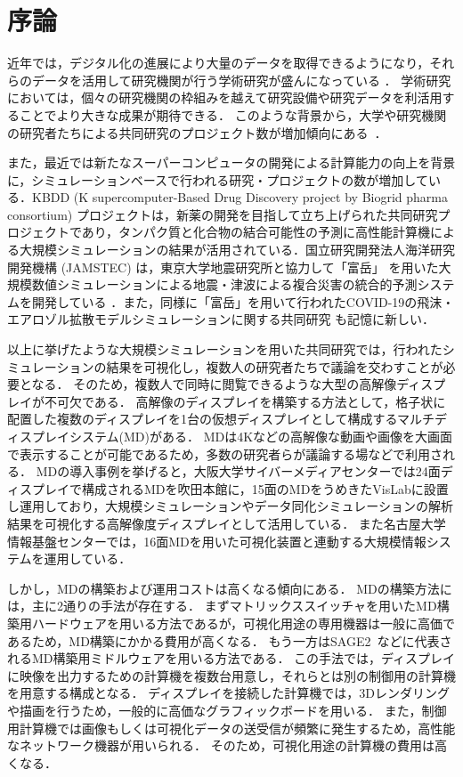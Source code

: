 \chapter{序論}

近年では，デジタル化の進展により大量のデータを取得できるようになり，それらのデータを活用して研究機関が行う学術研究が盛んになっている \cite{guideline}．
学術研究においては，個々の研究機関の枠組みを越えて研究設備や研究データを利活用することでより大きな成果が期待できる．
このような背景から，大学や研究機関の研究者たちによる共同研究のプロジェクト数が増加傾向にある~\cite{nisted,soumusyou}．

また，最近では新たなスーパーコンピュータの開発による計算能力の向上を背景に，シミュレーションベースで行われる研究・プロジェクトの数が増加している．KBDD (K supercomputer-Based Drug Discovery project by Biogrid pharma consortium) プロジェクト\cite{kbdd,kbddproject}は，新薬の開発を目指して立ち上げられた共同研究プロジェクトであり，タンパク質と化合物の結合可能性の予測に高性能計算機による大規模シミュレーションの結果が活用されている．国立研究開発法人海洋研究開発機構 (JAMSTEC) は，東京大学地震研究所と協力して「富岳」 \cite{fugaku}を用いた大規模数値シミュレーションによる地震・津波による複合災害の統合的予測システムを開発している \cite{jishin}．また，同様に「富岳」を用いて行われたCOVID-19の飛沫・エアロゾル拡散モデルシミュレーションに関する共同研究 \cite{covid-19}も記憶に新しい．

以上に挙げたような大規模シミュレーションを用いた共同研究では，行われたシミュレーションの結果を可視化し，複数人の研究者たちで議論を交わすことが必要となる．
そのため，複数人で同時に閲覧できるような大型の高解像ディスプレイが不可欠である．
高解像のディスプレイを構築する方法として，格子状に配置した複数のディスプレイを1台の仮想ディスプレイとして構成するマルチディスプレイシステム(MD)がある．
MDは4Kなどの高解像な動画や画像を大画面で表示することが可能であるため，多数の研究者らが議論する場などで利用される．
MDの導入事例を挙げると，大阪大学サイバーメディアセンターでは24面ディスプレイで構成されるMDを吹田本館に，15面のMDをうめきたVisLabに設置し運用しており，大規模シミュレーションやデータ同化シミュレーションの解析結果を可視化する高解像度ディスプレイとして活用している\cite{ciber_media}．
また名古屋大学情報基盤センターでは，16面MDを用いた可視化装置と連動する大規模情報システムを運用している\cite{nagoya}．

しかし，MDの構築および運用コストは高くなる傾向にある．
MDの構築方法には，主に2通りの手法が存在する．
まずマトリックススイッチャを用いたMD構築用ハードウェアを用いる方法であるが，可視化用途の専用機器は一般に高価であるため，MD構築にかかる費用が高くなる．
もう一方はSAGE2~\cite{sage2}などに代表されるMD構築用ミドルウェアを用いる方法である．
この手法では，ディスプレイに映像を出力するための計算機を複数台用意し，それらとは別の制御用の計算機を用意する構成となる．
ディスプレイを接続した計算機では，3Dレンダリングや描画を行うため，一般的に高価なグラフィックボードを用いる．
また，制御用計算機では画像もしくは可視化データの送受信が頻繁に発生するため，高性能なネットワーク機器が用いられる．
そのため，可視化用途の計算機の費用は高くなる．

